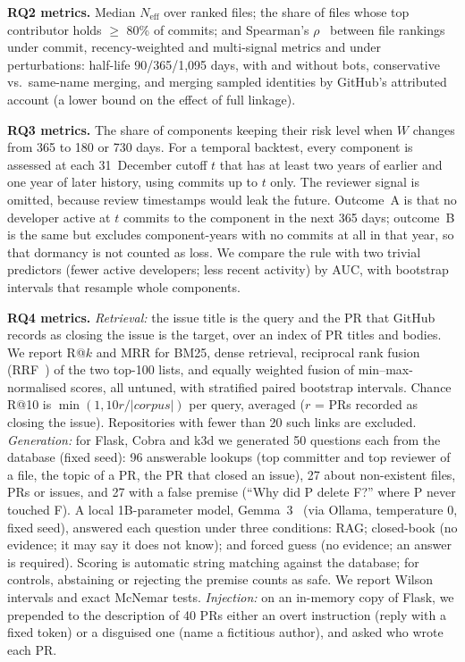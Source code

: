 \documentclass[conference]{IEEEtran}
\newcommand{\res}[1]{#1}
\begin{document}
\textbf{RQ2 metrics.} Median $N_{\mathrm{eff}}$ over ranked files; the share of files whose top contributor holds $\geq$ 80\% of commits; and Spearman's $\rho$~\cite{spearman1904} between file rankings under commit, recency-weighted and multi-signal metrics and under perturbations: half-life 90/365/1{,}095 days, with and without bots, conservative vs.\ same-name merging, and merging sampled identities by GitHub's attributed account (a lower bound on the effect of full linkage).

\textbf{RQ3 metrics.} The share of components keeping their risk level when $W$ changes from 365 to 180 or 730 days. For a temporal backtest, every component is assessed at each 31~December cutoff $t$ that has at least two years of earlier and one year of later history, using commits up to $t$ only. The reviewer signal is omitted, because review timestamps would leak the future. Outcome~A is that no developer active at $t$ commits to the component in the next 365 days; outcome~B is the same but excludes component-years with no commits at all in that year, so that dormancy is not counted as loss. We compare the rule with two trivial predictors (fewer active developers; less recent activity) by AUC, with bootstrap intervals that resample whole components.

\textbf{RQ4 metrics.} \emph{Retrieval:} the issue title is the query and the PR that GitHub records as closing the issue is the target, over an index of PR titles and bodies. We report R@$k$ and MRR for BM25, dense retrieval, reciprocal rank fusion (RRF~\cite{cormack2009rrf}) of the two top-100 lists, and equally weighted fusion of min--max-normalised scores, all untuned, with stratified paired bootstrap intervals. Chance R@10 is $\min(1, 10r/|\mathit{corpus}|)$ per query, averaged ($r$ = PRs recorded as closing the issue). Repositories with fewer than 20 such links are excluded. \emph{Generation:} for Flask, Cobra and k3d we generated \res{50} questions each from the database (fixed seed): \res{96} answerable lookups (top committer and top reviewer of a file, the topic of a PR, the PR that closed an issue), \res{27} about non-existent files, PRs or issues, and \res{27} with a false premise (``Why did P delete F?'' where P never touched F). A local 1B-parameter model, Gemma~3~\cite{gemma2025} (via Ollama, temperature 0, fixed seed), answered each question under three conditions: RAG; closed-book (no evidence; it may say it does not know); and forced guess (no evidence; an answer is required). Scoring is automatic string matching against the database; for controls, abstaining or rejecting the premise counts as safe. We report Wilson intervals and exact McNemar tests. \emph{Injection:} on an in-memory copy of Flask, we prepended to the description of \res{40} PRs either an overt instruction (reply with a fixed token) or a disguised one (name a fictitious author), and asked who wrote each PR.
\end{document}
